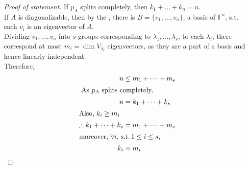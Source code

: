 \documentclass[fleqn, a4paper, 12pt, draft]{article}
\theoremstyle{definition}
\theoremstyle{theorem}
\theoremstyle{remark}
\newcommand{\suchthat}{\mathrm{\,s.t.\,}}
\numberwithin{corollary}{theorem}
\numberwithin{equation}{theorem}
\begin{document}
\begin{proof}[Proof of statement]
	If $p_A$ splits completely, then $k_1 + \dots + k_n = n$.\\
	If $A$ is diagonalizable, then by the , there is $B = \{v_1, \dots, v_n\}$, a basis of $\mathbb{F}^n$, s.t. each $v_i$ is an eigenvector of $A$.\\
	Dividing $v_1, \dots ,v_n$ into $s$ groups corresponding to $\lambda_1, \dots, \lambda_s$, to each $\lambda_i$, there correspond at most $m_i = \dim V_{\lambda_i}$ eigenvectors, as they are a part of a basis and hence linearly independent.\\
	Therefore,
	\begin{align*}
		n &\leq m_1 + \dots + m_s\\
		\intertext{	As $p_A$ splits completely,}
		n &= k_1 + \dots + k_s\\
		\intertext{Also, $k_i \geq m_i$}
		\therefore k_1 + \dots + k_s &= m_1 + \dots + m_s\\
		\intertext{moreover, $\forall i, \suchthat 1 \leq i \leq s$,}
		k_i &= m_i
	\end{align*}
\end{proof}
\end{document}
